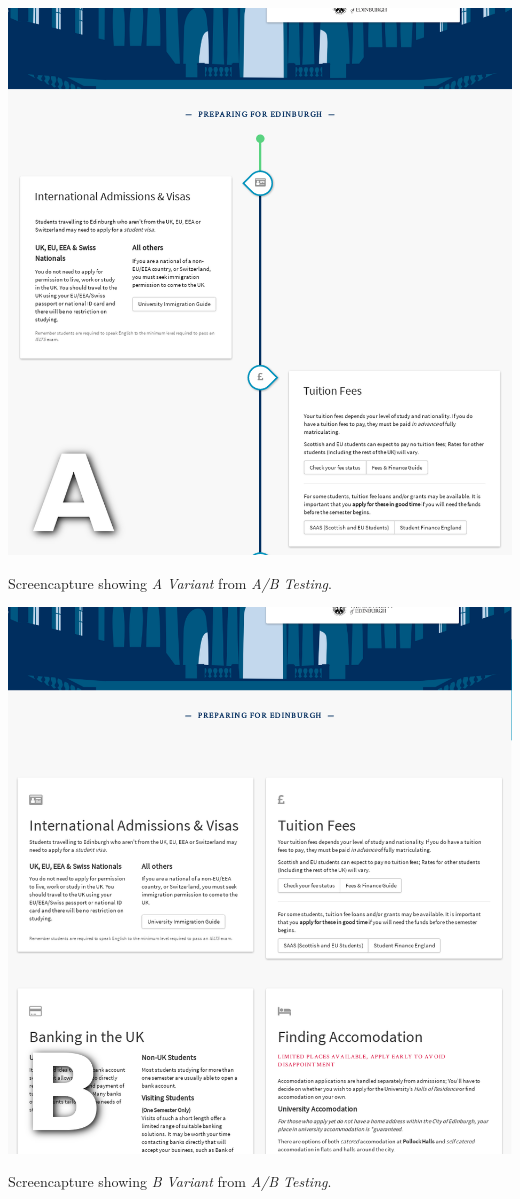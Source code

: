 \documentclass[a4paper, notoc]{tufte-handout}
\begin{document}
\begin{marginfigure}
  \includegraphics[width=\linewidth]{avariant.png}
  \caption{
    \label{fig:avariant}
    Screencapture showing \textit{A Variant} from \textit{A/B Testing}.
  }

\end{marginfigure}

\begin{marginfigure}
  \includegraphics[width=\linewidth]{bvariant.png}
  \caption{
    \label{fig:bvariant}
    Screencapture showing \textit{B Variant} from \textit{A/B Testing}.
  }

\end{marginfigure}
\end{document}

